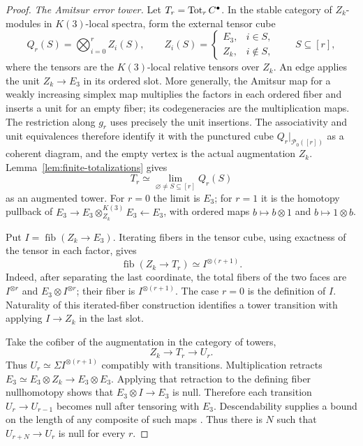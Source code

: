 \begin{proof}
\emph{The Amitsur error tower.}
Let $T_r=\operatorname{Tot}_r C^\bullet$.  In the stable category of $Z_k$-modules
in $K(3)$-local spectra, form the external tensor cube
\[
 Q_r(S)=\bigotimes_{i=0}^{r} Z_i(S),\qquad
 Z_i(S)=
 \begin{cases}E_3,&i\in S,\\ Z_k,&i\notin S,\end{cases}
 \qquad S\subseteq[r],
\]
where the tensors are the $K(3)$-local relative tensors over $Z_k$.
An edge applies the unit $Z_k\to E_3$ in its ordered slot.  More generally,
the Amitsur map for a weakly increasing simplex map multiplies the factors
in each ordered fiber and inserts a unit for an empty fiber; its
codegeneracies are the multiplication maps.  The restriction along $g_r$
uses precisely the unit insertions.  The associativity and unit equivalences
therefore identify it with the punctured cube $Q_r|_{\mathcal P_0([r])}$ as
a coherent diagram, and the empty vertex is the actual augmentation $Z_k$.
Lemma~\ref{lem:finite-totalizations} gives
\[
 T_r\simeq\lim_{\varnothing\ne S\subseteq[r]}Q_r(S)
\]
as an augmented tower.  For $r=0$ the limit is $E_3$; for $r=1$ it is the
homotopy pullback of
$E_3\to E_3\otimes^{K(3)}_{Z_k}E_3\leftarrow E_3$, with ordered maps
$b\mapsto b\otimes1$ and $b\mapsto1\otimes b$.

Put $I=\operatorname{fib}(Z_k\to E_3)$.  Iterating fibers in the tensor
cube, using exactness of the tensor in each factor, gives
\begin{equation}\label{eq:amitsur-error-fiber}
 \operatorname{fib}(Z_k\to T_r)
       \simeq I^{\otimes(r+1)}.
\end{equation}
Indeed, after separating the last coordinate, the total fibers of the two
faces are $I^{\otimes r}$ and $E_3\otimes I^{\otimes r}$; their fiber is
$I^{\otimes(r+1)}$.  The case $r=0$ is the definition of $I$.  Naturality
of this iterated-fiber construction identifies a tower transition with
applying $I\to Z_k$ in the last slot.

Take the cofiber of the augmentation in the category of towers,
\[
  Z_k\longrightarrow T_r\longrightarrow U_r.
\]
Thus $U_r\simeq\Sigma I^{\otimes(r+1)}$ compatibly with transitions.
Multiplication retracts
$E_3\simeq E_3\otimes Z_k\to E_3\otimes E_3$.  Applying that retraction
to the defining fiber nullhomotopy shows that
$E_3\otimes I\to E_3$ is null.  Therefore each transition
$U_r\to U_{r-1}$ becomes null after tensoring with $E_3$.
Descendability supplies a bound on the length of any composite of such maps
\cite[Proposition~3.27 and Corollary~4.4]{Mathew16}.  Thus there is
$N$ such that $U_{r+N}\to U_r$ is null for every $r$.


\end{proof}

